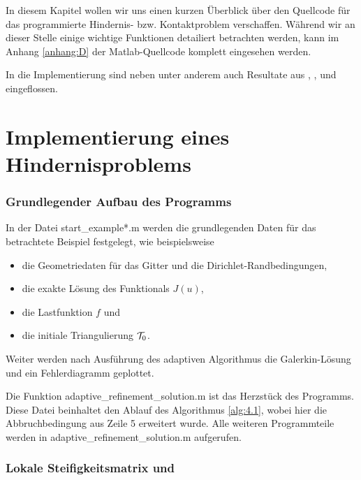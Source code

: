 \label{kap:5}

In diesem Kapitel wollen wir uns einen kurzen Überblick über den Quellcode für das programmierte Hindernis- bzw. Kontaktproblem verschaffen. Während wir an dieser Stelle einige wichtige Funktionen detailiert betrachten werden, kann  im Anhang \ref{anhang:D} der Matlab-Quellcode komplett eingesehen werden.

In die Implementierung sind neben \cite{ZouVee} unter anderem auch Resultate aus \cite{MorNoc}, \cite{BarCar}, \cite{BraeFEM} und \cite{EPS} eingeflossen.


\section{Implementierung eines Hindernisproblems}
\label{kap:5.1}


\subsubsection{Grundlegender Aufbau des Programms}

In der Datei {\ttfamily start_example*.m} werden die grundlegenden Daten für das betrachtete Beispiel festgelegt, wie beispielsweise
\begin{itemize}
\item die Geometriedaten für das Gitter und die Dirichlet-Randbedingungen,
\item die exakte Lösung des Funktionals $J(u)$,
\item die Lastfunktion $f$ und
\item die initiale Triangulierung $\mathcal T_0$.
\end{itemize}
Weiter werden nach Ausführung des adaptiven Algorithmus die Galerkin-Lösung und ein Fehlerdiagramm geplottet. 

Die Funktion {\ttfamily adaptive_refinement_solution.m} ist das Herzstück des Programms. Diese Datei beinhaltet den Ablauf des Algorithmus \ref{alg:4.1}, wobei hier die Abbruchbedingung aus Zeile 5 erweitert wurde. Alle weiteren Programmteile werden in {\ttfamily adaptive_refinement_solution.m} aufgerufen.


\subsubsection{Lokale Steifigkeitsmatrix und }


